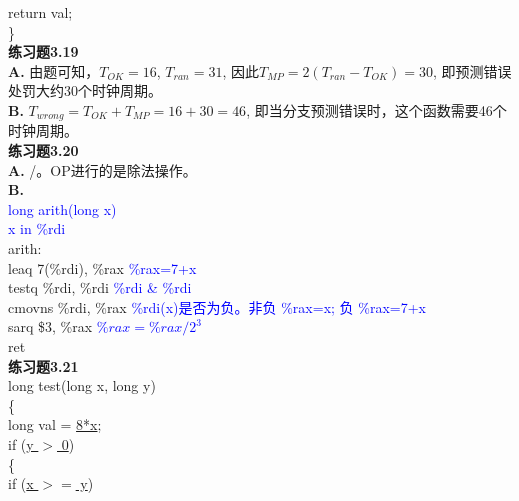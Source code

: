 \documentclass{article}
\newcommand{\blue}[1]{\textcolor{blue}{#1}}
\begin{document}
\begin{CJK}{UTF8}{uyhei}
	\hspace*{2em}	return val;						\\
\}					\\[3ex]
\textbf{练习题3.19}	\\[1ex]
\textbf{A.} 由题可知，$T_{OK}=16$, $T_{ran}=31$, 因此$T_{MP}=2(T_{ran}-T_{OK})=30$, 即预测错误处罚大约30个时钟周期。	\\[1ex]
\textbf{B.} $T_{wrong}=T_{OK}+T_{MP}=16+30=46$, 即当分支预测错误时，这个函数需要46个时钟周期。	\\[3ex]
\textbf{练习题3.20}	\\[1ex]
\textbf{A.} /。OP进行的是除法操作。	\\[1ex]
\textbf{B.} 	\\
\hspace*{2em}	\blue{long arith(long x)}	\\
\hspace*{2em}	\blue{x in \%rdi}		\\
	       arith:						\\
		\hspace*{2em}	leaq	7(\%rdi), \%rax		\hspace*{2em}	\blue{\%rax=7+x}	\\
		\hspace*{2em}	testq	\%rdi, \%rdi		\hspace*{2em}	\blue{\%rdi \& \%rdi}	\\
		\hspace*{2em}	cmovns	\%rdi, \%rax		\hspace*{2em}	\blue{\%rdi(x)是否为负。非负 \%rax=x; 负 \%rax=7+x}	\\
		\hspace*{2em}	sarq	\$3, \%rax		\hspace*{2em}	\blue{$\%rax=\%rax/2^3$}	\\
		\hspace*{2em}	ret				\\[3ex]
\textbf{练习题3.21}	\\[1ex]
long test(long x, long y)	\\
\{	\\
	\hspace*{2em}	long val = \underline{8*x};			\\
	\hspace*{2em}	if (\underline{y $>$ 0})				\\
	\hspace*{2em}	\{	\\
	\hspace*{4em}		if (\underline{x $>=$ y})			\\

\end{CJK}
\end{document}
